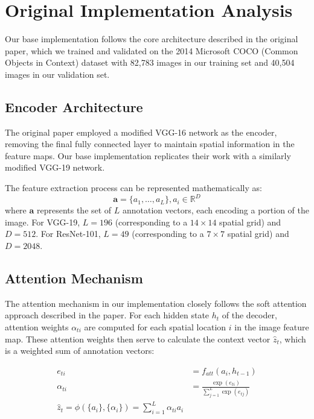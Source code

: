 \documentclass{article}
\theoremstyle{plain}
\theoremstyle{definition}
\theoremstyle{remark}
\begin{document}
\section{Original Implementation Analysis}

Our base implementation follows the core architecture described in the original paper, which we trained and validated on the 2014 Microsoft COCO (Common Objects in Context) dataset with 82,783 images in our training set and 40,504 images in our validation set. 

\subsection{Encoder Architecture}

The original paper employed a modified VGG-16 network as the encoder, removing the final fully connected layer to maintain spatial information in the feature maps. Our base implementation replicates their work with a similarly modified VGG-19 network. 

The feature extraction process can be represented mathematically as:
\begin{equation}
\textbf{a} = \{a_1, \ldots, a_L\}, a_i \in \mathbb{R}^D
\end{equation}
where $\textbf{a}$ represents the set of $L$ annotation vectors, each encoding a portion of the image. For VGG-19, $L = 196$ (corresponding to a $14 \times 14$ spatial grid) and $D = 512$. For ResNet-101, $L = 49$ (corresponding to a $7 \times 7$ spatial grid) and $D = 2048$.

\subsection{Attention Mechanism}

The attention mechanism in our implementation closely follows the soft attention approach described in the paper. For each hidden state $h_t$ of the decoder, attention weights $\alpha_{ti}$ are computed for each spatial location $i$ in the image feature map. These attention weights then serve to calculate the context vector $\hat{z}_t$, which is a weighted sum of annotation vectors:

\begin{align}
e_{ti} &= f_{att}(a_i, h_{t-1}) \\
\alpha_{ti} &= \frac{\exp(e_{ti})}{\sum_{j=1}^{L} \exp(e_{tj})} \\
\hat{z}_t = \phi(\{a_i\}, \{\alpha_i\}) = \sum_{i=1}^{L} \alpha_{ti} a_i
\end{align}
\end{document}
